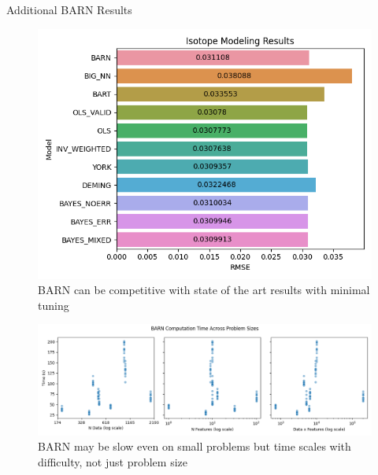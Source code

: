\documentclass{beamer}
\begin{document}
\begin{frame}
\begin{columns}
\begin{column}{.33\textwidth}
\begin{minipage}{.98\textwidth}
{\begin{myblock}{Additional BARN Results}
\begin{figure}[h]
\centering
    \includegraphics[scale=1.2]{iso_results.png}
    \caption{BARN can be competitive with state of the art results with minimal tuning}
    \label{fig:results_isotope}
\end{figure}

\begin{figure}[h]
\centering
    \includegraphics[scale=1.]{time_results.png}
    \caption{BARN may be slow even on small problems but time scales with difficulty, not just problem size}
    \label{fig:results_time}
\end{figure}


\end{myblock}}
\end{minipage}
\end{column}
\end{columns}
\end{frame}
\end{document}
